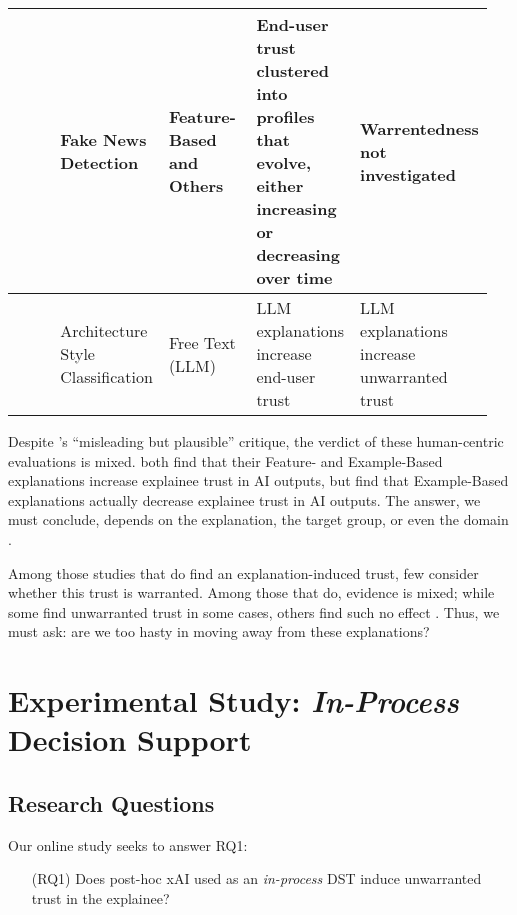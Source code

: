 \begin{table}[htbp]
{\begin{tabular}{p{0.2\linewidth} p{0.15\linewidth} p{0.2\linewidth} p{0.2\linewidth} p{0.2\linewidth}}
        \textcite{mohseni_trust_nodate} & Fake News Detection & Feature-Based and Others & End-user trust clustered into profiles that evolve, either increasing or decreasing over time & Warrentedness not investigated \\
        \bottomrule
        \textcite{Spitzer_Holstein_Morrison_Holstein_Satzger_Kühl} & Architecture Style Classification & Free Text (LLM) & LLM explanations increase end-user trust & LLM explanations increase unwarranted trust \\
    \end{tabular}
    }
    \label{tab:studies}
\end{table}

Despite \textcite{Lipton}'s ``misleading but plausible'' critique, the verdict of these human-centric evaluations is mixed. \textcite{lai_human_2019,jacobs_how_2021} both find that their Feature- and Example-Based explanations increase explainee trust in AI outputs, but \textcite{binns_its_2018} find that Example-Based explanations actually decrease explainee trust in AI outputs. The answer, we must conclude, depends on the explanation, the target group, or even the domain \cite{mohseni_trust_nodate}. 

Among those studies that do find an explanation-induced trust, few consider whether this trust is warranted. Among those that do, evidence is mixed; while some find unwarranted trust in some cases, others find such no effect \cite{lai_human_2019,jacobs_how_2021}. Thus, we must ask: are we too hasty in moving away from these explanations? 

\section{Experimental Study: \emph{In-Process} Decision Support}\label{sec:online}
\subsection{Research Questions}
Our online study seeks to answer RQ1:

\begin{enumerate}
    \item[(RQ1)] Does post-hoc xAI used as an \emph{in-process} DST induce unwarranted trust in the explainee?
\end{enumerate}

